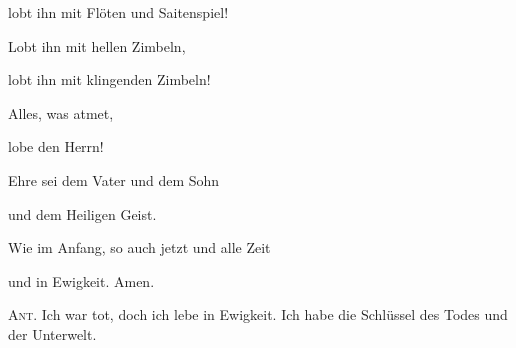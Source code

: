 lobt ihn mit Flöten und Saitenspiel!

\noindent Lobt ihn mit hellen Zimbeln,~\GreStar{}~\nopagebreak

lobt ihn mit klingenden Zimbeln!

\noindent Alles, was atmet,~\GreStar{}~\nopagebreak

lobe den Herrn!

\noindent Ehre sei dem Vater und dem Sohn~\GreStar{}~\nopagebreak

und dem Heiligen Geist.

\noindent Wie im Anfang, so auch jetzt und alle Zeit~\GreStar{}~\nopagebreak

und in Ewigkeit. Amen.

\vspace{10pt}

\noindent \textsc{Ant.} Ich war tot, doch ich lebe in Ewigkeit. Ich habe die Schlüssel des Todes und der Unterwelt.
